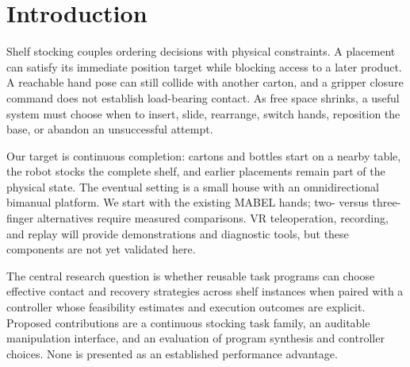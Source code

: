 \section{Introduction}
Shelf stocking couples ordering decisions with physical constraints. A placement
can satisfy its immediate position target while blocking access to a later
product. A reachable hand pose can still collide with another carton, and a
gripper closure command does not establish load-bearing contact. As free space
shrinks, a useful system must choose when to insert, slide, rearrange, switch
hands, reposition the base, or abandon an unsuccessful attempt.

Our target is continuous completion: cartons and bottles start on a nearby
table, the robot stocks the complete shelf, and earlier placements remain part
of the physical state. The eventual setting is a small house with an
omnidirectional bimanual platform. We start with the existing MABEL hands;
two- versus three-finger alternatives require measured comparisons. VR
teleoperation, recording, and replay will provide demonstrations and diagnostic
tools, but these components are not yet validated here.

The central research question is whether reusable task programs can choose
effective contact and recovery strategies across shelf instances when paired
with a controller whose feasibility estimates and execution outcomes are
explicit. Proposed contributions are a continuous stocking task family, an
auditable manipulation interface, and an evaluation of program synthesis and
controller choices. None is presented as an established performance advantage.
